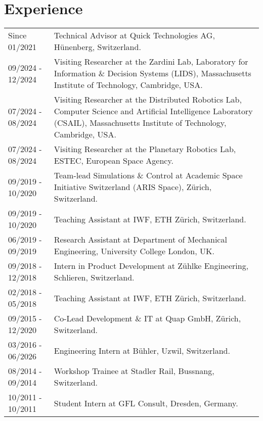 \section*{Experience}
\noindent
\begin{longtable}{p{} p{}}
    Since 01/2021 & Technical Advisor at Quick Technologies AG, Hünenberg, Switzerland.\\
    09/2024 - 12/2024 & Visiting Researcher at the Zardini Lab, Laboratory for Information \& Decision Systems (LIDS), Massachusetts Institute of Technology, Cambridge, USA.\\
    07/2024 - 08/2024 & Visiting Researcher at the Distributed Robotics Lab, Computer Science and Artificial Intelligence Laboratory (CSAIL), Massachusetts Institute of Technology, Cambridge, USA.\\
    07/2024 - 08/2024 & Visiting Researcher at the Planetary Robotics Lab, ESTEC, European Space Agency.\\
    09/2019 - 10/2020 & Team-lead Simulations \& Control at Academic Space Initiative Switzerland (ARIS Space), Zürich, Switzerland.\\
    09/2019 - 10/2020 & Teaching Assistant at IWF, ETH Zürich, Switzerland.\\
    06/2019 - 09/2019 & Research Assistant at Department of Mechanical Engineering, University College London, UK.\\
    09/2018 - 12/2018 & Intern in Product Development at Zühlke Engineering, Schlieren, Switzerland.\\
    02/2018 - 05/2018 & Teaching Assistant at IWF, ETH Zürich, Switzerland.\\
    09/2015 - 12/2020 & Co-Lead Development \& IT at Quap GmbH, Zürich, Switzerland.\\
    03/2016 - 06/2026 & Engineering Intern at Bühler, Uzwil, Switzerland.\\
    08/2014 - 09/2014 & Workshop Trainee at Stadler Rail, Bussnang, Switzerland.\\
    10/2011 - 10/2011 & Student Intern at GFL Consult, Dresden, Germany.
\end{longtable}

